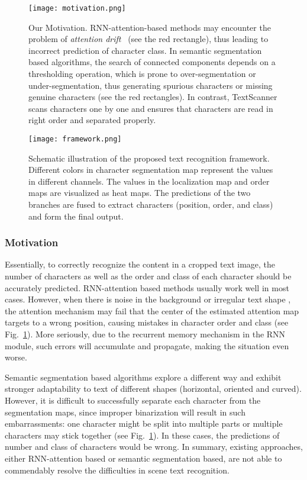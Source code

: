 \documentclass[letterpaper]{article} \usepackage{aaai20}  \usepackage{times}  \usepackage{helvet} \usepackage{courier}  \usepackage[hyphens]{url}  \usepackage{graphicx} \urlstyle{rm} \def\UrlFont{\rm}  \usepackage{graphicx}  \frenchspacing  \setlength{\pdfpagewidth}{8.5in}  \setlength{\pdfpageheight}{11in}
\begin{document}
\begin{figure}[t]
\centering
\texttt{[image: motivation.png]}

\caption{Our Motivation.
RNN-attention-based methods may encounter the problem of \textit{attention drift}~\cite{cheng2017fan} (see the red rectangle), thus leading to incorrect prediction of character class.
In semantic segmentation based algorithms, the search of connected components depends on a thresholding operation, which is prone to over-segmentation or under-segmentation, thus generating spurious characters or missing genuine characters (see the red rectangles).
In contrast, TextScanner scans characters one by one and ensures that characters are read in right order and separated properly.}

\label{fig:motivation}
\end{figure}
\begin{figure*}[ht]
\centering
\texttt{[image: framework.png]}


\caption{Schematic illustration of the proposed text recognition framework. Different colors in character segmentation map represent the values in different channels. The values in the localization map and order maps are visualized as heat maps. The predictions of the two branches are fused to extract characters (position, order, and class) and form the final output.}
\label{fig:framework}
\end{figure*}

\subsubsection{Motivation}

Essentially, to correctly recognize the content in a cropped text image, the number of characters as well as the order and class of each character should be accurately predicted. RNN-attention based methods usually work well in most cases. However, when there is
noise in the background or irregular text shape
, the attention mechanism may fail that the center of the estimated attention map targets to a wrong position, causing mistakes in character order and class (see Fig.~\ref{fig:motivation}). More seriously, due to the recurrent memory mechanism in the RNN module, such errors will accumulate and propagate, making the situation even worse.

Semantic segmentation based algorithms explore a different way and exhibit stronger adaptability to text of different shapes (horizontal, oriented and curved). However, it is difficult to successfully separate each character from the segmentation maps, since improper binarization will result in such embarrassments: one character might be split into multiple parts or multiple characters may stick together (see Fig.~\ref{fig:motivation}). In these cases, the predictions of number and class of characters would be wrong. In summary, existing approaches, either RNN-attention based or semantic segmentation based, are not able to commendably resolve the difficulties in scene text recognition.
\end{document}
